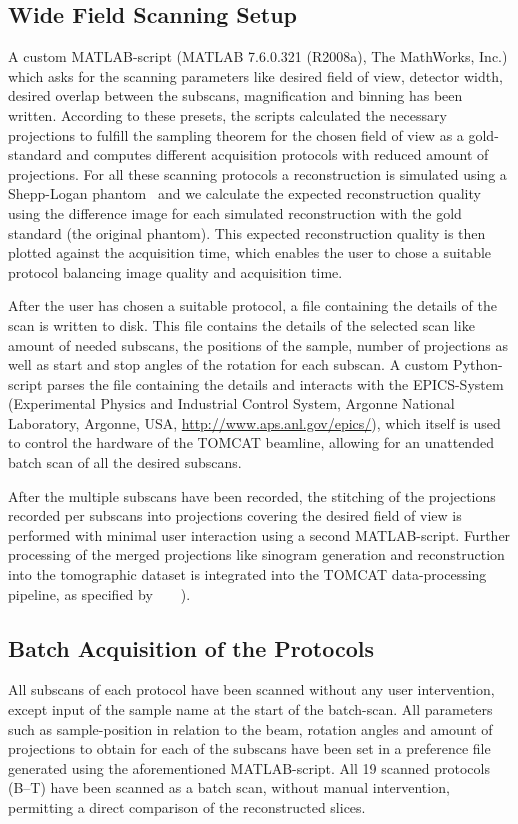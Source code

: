 \subsection{Wide Field Scanning Setup}%
\label{subsec:wfs-setup}%
A custom MATLAB-script (MATLAB\textsuperscript{\textregistered} 7.6.0.321 (R2008a), The MathWorks, Inc.) which asks for the scanning parameters like desired field of view, detector width, desired overlap between the subscans, magnification and binning has been written. According to these presets, the scripts calculated the necessary projections to fulfill the sampling theorem for the chosen field of view as a gold-standard and computes different acquisition protocols with reduced amount of projections. For all these scanning protocols a reconstruction is simulated using a Shepp-Logan phantom~\cite{Shepp1974} and we calculate the expected reconstruction quality using the difference image for each simulated reconstruction with the gold standard (the original phantom). This expected reconstruction quality is then plotted against the acquisition time, which enables the user to chose a suitable protocol balancing image quality and acquisition time.

After the user has chosen a suitable protocol, a file containing the details of the scan is written to disk. This file contains the details of the selected scan like amount of needed subscans, the positions of the sample, number of projections as well as start and stop angles of the rotation for each subscan. A custom Python-script parses the file containing the details and interacts with the EPICS-System (Experimental Physics and Industrial Control System, Argonne National Laboratory, Argonne, USA, \url{http://www.aps.anl.gov/epics/}), which itself is used to control the hardware of the TOMCAT beamline, allowing for an unattended batch scan of all the desired subscans.

After the multiple subscans have been recorded, the stitching of the projections recorded per subscans into projections covering the desired field of view is performed with minimal user interaction using a second MATLAB-script. Further processing of the merged projections like sinogram generation and reconstruction into the tomographic dataset is integrated into the TOMCAT data-processing pipeline, as specified by%
\ifhtml
	~\citet{Hintermueller2009}
\else
	~
\fi%
).

\subsection{Batch Acquisition of the Protocols}%
All subscans of each protocol have been scanned without any user intervention, except input of the sample name at the start of the batch-scan. All parameters such as sample-position in relation to the beam, rotation angles and amount of projections to obtain for each of the subscans have been set in a preference file generated using the aforementioned MATLAB-script. All 19 scanned protocols (B--T) have been scanned as a batch scan, without manual intervention, permitting a direct comparison of the reconstructed slices.

